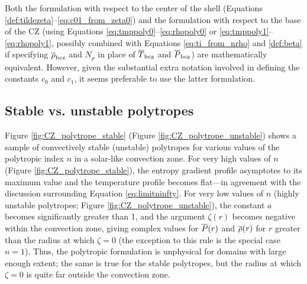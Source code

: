 \documentclass[12pt]{article}
\begin{document}
Both the formulation with respect to the center of the shell (Equations \eqref{def:tildezeta}--\eqref{eq:c01_from_zeta0}) and the formulation with respect to the base of the CZ (using Equations \eqref{eq:tmppoly0}--\eqref{eq:rhopoly0} or   \eqref{eq:tmppoly1}--\eqref{eq:rhopoly1}, possibly combined with Equations \eqref{eq:ti_from_nrho} and \eqref{def:beta} if specifying $\overline{\rho}_{\rm{bcz}}$ and $N_\rho$ in place of $\overline{T}_{\rm{bcz}}$ and $\overline{P}_{\rm{bcz}}$) are mathematically equivalent. However, given the substantial extra notation involved in defining the constants $c_0$ and $c_1$, it seems preferable to use the latter formulation. 

\subsection{Stable vs. unstable polytropes}
Figure \ref{fig:CZ_polytrope_stable} (Figure \ref{fig:CZ_polytrope_unstable}) shows a sample of convectively stable (unstable) polytropes for various values of the polytropic index $n$ in a solar-like convection zone. For very high values of $n$ (Figure \ref{fig:CZ_polytrope_stable}), the entropy gradient profile asymptotes to its maximum value and the temperature profile becomes flat---in agreement with the discussion surrounding Equation \eqref{eq:limitninfty}. For very low values of $n$ (highly unstable polytropes; Figure \ref{fig:CZ_polytrope_unstable}), the constant $a$ becomes significantly greater than 1, and the argument $\zeta(r)$ becomes negative within the convection zone, giving complex values for $\overline{P}(r)$ and $\overline{\rho}(r)$ for $r$ greater than the radius at which $\zeta=0$ (the exception to this rule is the special case $n=1$). Thus, the polytropic formulation is unphysical for domains with large enough extent; the same is true for the stable polytropes, but the radius at which $\zeta=0$ is quite far outside the convection zone.
\end{document}
